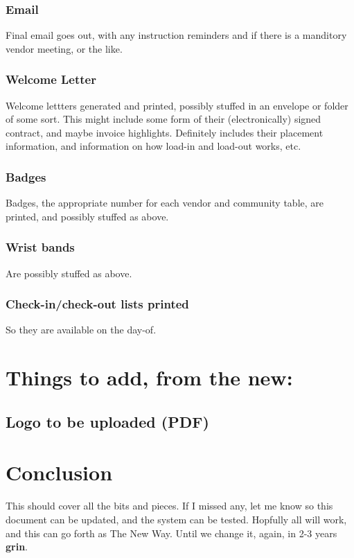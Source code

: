 \documentclass[captions=tablesignature]{scrartcl}
\begin{document}
\subsubsection{Email}
\label{sec-3-2-18}
Final email goes out, with any instruction reminders and if there
is a manditory vendor meeting, or the like.

\subsubsection{Welcome Letter}
\label{sec-3-2-19}
Welcome lettters generated and printed, possibly stuffed in an
envelope or folder of some sort.
This might include some form of their (electronically) signed
contract, and maybe invoice highlights.  Definitely includes their
placement information, and information on how load-in and load-out
works, etc.

\subsubsection{Badges}
\label{sec-3-2-20}
Badges, the appropriate number for each vendor and community
table, are printed, and possibly stuffed as above.

\subsubsection{Wrist bands}
\label{sec-3-2-21}
Are possibly stuffed as above.

\subsubsection{Check-in/check-out lists printed}
\label{sec-3-2-22}
So they are available on the day-of.

\section{Things to add, from the new:}
\label{sec-4}
\subsection{Logo to be uploaded (PDF)}
\label{sec-4-1}

\section{Conclusion}
\label{sec-5}
This should cover all the bits and pieces.  If I missed any, let me
know so this document can be updated, and the system can be tested.
Hopfully all will work, and this can go forth as The New Way.  Until
we change it, again, in 2-3 years \textbf{grin}.
\end{document}
